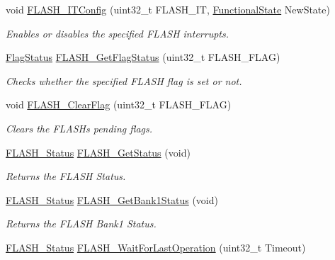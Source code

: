 \begin{DoxyCompactItemize}
void \hyperlink{group___f_l_a_s_h___private___functions_ga94c1e51a9c3bf8d48eb6eb4a4d054861}{F\+L\+A\+S\+H\+\_\+\+I\+T\+Config} (uint32\+\_\+t F\+L\+A\+S\+H\+\_\+\+IT, \hyperlink{group___exported__types_gac9a7e9a35d2513ec15c3b537aaa4fba1}{Functional\+State} New\+State)
\begin{DoxyCompactList}\small\item\em Enables or disables the specified F\+L\+A\+SH interrupts. \end{DoxyCompactList}\item 
\hyperlink{group___exported__types_ga89136caac2e14c55151f527ac02daaff}{Flag\+Status} \hyperlink{group___f_l_a_s_h___private___functions_gae3fb545e32f21501ca27d4380e0f2088}{F\+L\+A\+S\+H\+\_\+\+Get\+Flag\+Status} (uint32\+\_\+t F\+L\+A\+S\+H\+\_\+\+F\+L\+AG)
\begin{DoxyCompactList}\small\item\em Checks whether the specified F\+L\+A\+SH flag is set or not. \end{DoxyCompactList}\item 
void \hyperlink{group___f_l_a_s_h___private___functions_gac4be1d486483fa5cd70ec77d44ca8f87}{F\+L\+A\+S\+H\+\_\+\+Clear\+Flag} (uint32\+\_\+t F\+L\+A\+S\+H\+\_\+\+F\+L\+AG)
\begin{DoxyCompactList}\small\item\em Clears the F\+L\+A\+SH\textquotesingle{}s pending flags. \end{DoxyCompactList}\item 
\hyperlink{group___f_l_a_s_h___exported___types_gadc63a6f3404ff1f71229a66915e9cdc0}{F\+L\+A\+S\+H\+\_\+\+Status} \hyperlink{group___f_l_a_s_h___private___functions_gac265b8d1e7ea11e44ceee28797c3debb}{F\+L\+A\+S\+H\+\_\+\+Get\+Status} (void)
\begin{DoxyCompactList}\small\item\em Returns the F\+L\+A\+SH Status. \end{DoxyCompactList}\item 
\hyperlink{group___f_l_a_s_h___exported___types_gadc63a6f3404ff1f71229a66915e9cdc0}{F\+L\+A\+S\+H\+\_\+\+Status} \hyperlink{group___f_l_a_s_h___private___functions_ga9d5b76b75ef4c578cc45dc836a1929b6}{F\+L\+A\+S\+H\+\_\+\+Get\+Bank1\+Status} (void)
\begin{DoxyCompactList}\small\item\em Returns the F\+L\+A\+SH Bank1 Status. \end{DoxyCompactList}\item 
\hyperlink{group___f_l_a_s_h___exported___types_gadc63a6f3404ff1f71229a66915e9cdc0}{F\+L\+A\+S\+H\+\_\+\+Status} \hyperlink{group___f_l_a_s_h___private___functions_ga2ad803999ae93ec03700983c59cae264}{F\+L\+A\+S\+H\+\_\+\+Wait\+For\+Last\+Operation} (uint32\+\_\+t Timeout)

\end{DoxyCompactItemize}
